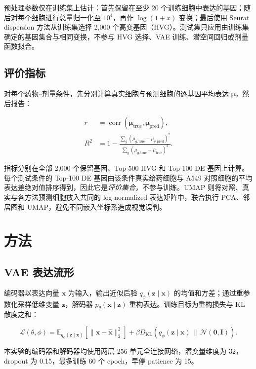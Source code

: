 \documentclass[UTF8,11pt,a4paper,fontset=fandol]{ctexart}
\begin{document}
预处理参数仅在训练集上估计：首先保留在至少 20 个训练细胞中表达的基因；随后对每个细胞进行总量归一化至 $10^4$，再作 $\log(1+x)$ 变换；最后使用 Seurat dispersion 方法从训练集选择 2,000 个高变基因（HVG）。测试集只应用由训练集确定的基因集合与相同变换，不参与 HVG 选择、VAE 训练、潜空间回归或剂量函数拟合。

\subsection{评价指标}

对每个药物--剂量条件，先分别计算真实细胞与预测细胞的逐基因平均表达 $\bm{\mu}$，然后报告：

\begin{align}
r &= \operatorname{corr}(\bm{\mu}_{\mathrm{true}},\bm{\mu}_{\mathrm{pred}}), \\
R^2 &= 1-\frac{\sum_g(\mu_{g,\mathrm{true}}-\mu_{g,\mathrm{pred}})^2}
{\sum_g(\mu_{g,\mathrm{true}}-\bar{\mu}_{\mathrm{true}})^2}.
\end{align}

指标分别在全部 2,000 个保留基因、Top-500 HVG 和 Top-100 DE 基因上计算。每个测试条件的 Top-100 DE 基因由该条件真实给药细胞与 A549 对照细胞的平均表达差绝对值排序得到，因此它是\emph{评价集合}，不参与训练。UMAP 则将对照、真实与各方法预测细胞放入共同的 log-normalized 表达矩阵中，联合执行 PCA、邻居图和 UMAP，避免不同嵌入坐标系造成视觉误判。

\section{方法}

\subsection{VAE 表达流形}

编码器以表达向量 $\bm{x}$ 为输入，输出近似后验 $q_{\phi}(\bm{z}\mid\bm{x})$ 的均值和方差；通过重参数化采样低维变量 $\bm{z}$，解码器 $p_{\theta}(\bm{x}\mid\bm{z})$ 重构表达。训练目标为重构损失与 KL 散度之和：

\begin{equation}
\mathcal{L}(\theta,\phi)=
\mathbb{E}_{q_{\phi}(\bm{z}\mid\bm{x})}
\left[\lVert\bm{x}-\hat{\bm{x}}\rVert_2^2\right]
+\beta D_{\mathrm{KL}}\!\left(q_{\phi}(\bm{z}\mid\bm{x})\,\|\,\mathcal{N}(\bm{0},\bm{I})\right).
\end{equation}

本实验的编码器和解码器均使用两层 256 单元全连接网络，潜变量维度为 32，dropout 为 0.15，最多训练 60 个 epoch，早停 patience 为 15。
\end{document}
